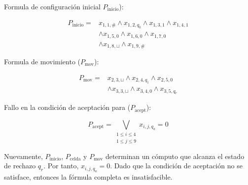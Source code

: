 Formula de configuración inicial $P_{\mathrm{inicio}}$):

\[
\begin{aligned}
P_{\mathrm{inicio}} ={}&
x_{1,1,\#} \wedge x_{1,2,q_0}
\wedge x_{1,3,1} \wedge x_{1,4,1}\\
&\wedge x_{1,5,0} \wedge x_{1,6,0}
\wedge x_{1,7,0}\\
&\wedge x_{1,8,\sqcup}
\wedge x_{1,9,\#}
\end{aligned}
\]

Formula de movimiento ($P_{\mathrm{mov}}$):

\[
\begin{aligned}
P_{\mathrm{mov}} ={}&
x_{2,3,\sqcup} \wedge x_{2,4,q_1}
\wedge x_{2,5,0}\\
&\wedge x_{3,3,\sqcup}
\wedge x_{3,4,0}
\wedge x_{3,5,q_r}
\end{aligned}
\]

Fallo en la condición de aceptación para ($P_{\mathrm{acept}}$):

\[
P_{\mathrm{acept}} =
\bigvee_{\substack{1 \leq i \leq 4\\
1 \leq j \leq 9}}
x_{i,j,q_a}
=
\text{0}
\]

Nuevamente, $P_{\mathrm{inicio}}$,
$P_{\mathrm{celda}}$ y $P_{\mathrm{mov}}$
determinan un cómputo que alcanza el estado de rechazo
$q_r$. Por tanto, \(x_{i,j,q_a}=\text{0}\). Dado que la condición de aceptación no se satisface, entonces la fórmula completa es insatisfacible.
